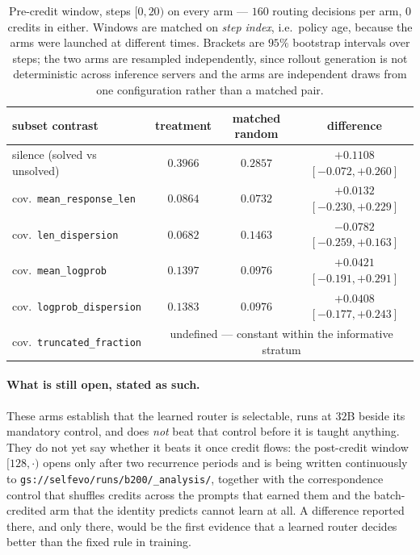 \begin{table}[t]
\centering\small
\caption{Pre-credit window, steps $[0,20)$ on every arm --- $160$ routing decisions per arm, $0$
credits in either. Windows are matched on \emph{step index}, i.e.\ policy age, because the arms
were launched at different times. Brackets are $95\%$ bootstrap intervals over steps; the two
arms are resampled independently, since rollout generation is not deterministic across inference
servers and the arms are independent draws from one configuration rather than a matched pair.}
\label{tab:m8pre}
\begin{tabular}{lccc}
\toprule
subset contrast & treatment & matched random & difference \\
\midrule
silence (solved vs unsolved)      & $0.3966$ & $0.2857$ & $+0.1108$ $[-0.072, +0.260]$ \\
cov.\ \texttt{mean\_response\_len}   & $0.0864$ & $0.0732$ & $+0.0132$ $[-0.230, +0.229]$ \\
cov.\ \texttt{len\_dispersion}       & $0.0682$ & $0.1463$ & $-0.0782$ $[-0.259, +0.163]$ \\
cov.\ \texttt{mean\_logprob}         & $0.1397$ & $0.0976$ & $+0.0421$ $[-0.191, +0.291]$ \\
cov.\ \texttt{logprob\_dispersion}   & $0.1383$ & $0.0976$ & $+0.0408$ $[-0.177, +0.243]$ \\
cov.\ \texttt{truncated\_fraction}   & \multicolumn{3}{c}{undefined --- constant within the informative stratum} \\
\bottomrule
\end{tabular}
\end{table}

\paragraph{What is still open, stated as such.} These arms establish that the learned router is
selectable, runs at $32$B beside its mandatory control, and does \emph{not} beat that control
before it is taught anything. They do not yet say whether it beats it once credit flows: the
post-credit window $[128,\cdot)$ opens only after two recurrence periods and is being written
continuously to \texttt{gs://selfevo/runs/b200/\_analysis/}, together with the correspondence
control that shuffles credits across the prompts that earned them and the batch-credited arm
that the identity predicts cannot learn at all. A difference reported there, and only there,
would be the first evidence that a learned router decides better than the fixed rule in training.

